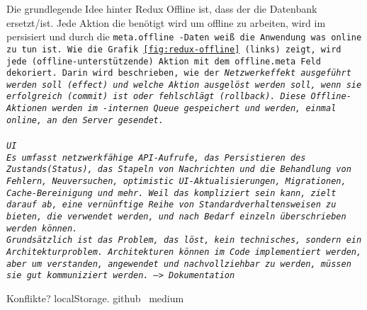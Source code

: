 Die grundlegende Idee hinter Redux Offline ist, dass der  die Datenbank ersetzt/ist. Jede Aktion die benötigt wird um offline zu arbeiten, wird im  persisiert und durch die \tt{meta.offline} -Daten weiß die Anwendung was online zu tun ist. Wie die Grafik \ref{fig:redux-offline} (links) zeigt, wird jede (offline-unterstützende) Aktion mit dem \tt{offline.meta} Feld dekoriert. Darin wird beschrieben, wie der \it{Netzwerkeffekt} ausgeführt werden soll (\tt{effect}) und welche Aktion ausgelöst werden soll, wenn sie erfolgreich (\tt{commit}) ist oder fehlschlägt (\tt{rollback}). Diese Offline-Aktionen werden im -internen \gls{Queue} gespeichert und werden, einmal online, an den Server gesendet.\\\\
\gls{UI}\\
 Es umfasst netzwerkfähige \gls{API}-Aufrufe, das Persistieren des Zustands(Status), das Stapeln von Nachrichten und die Behandlung von Fehlern, Neuversuchen, \gls{optimistic UI}-Aktualisierungen, Migrationen, Cache-Bereinigung und mehr.
Weil das kompliziert sein kann, zielt  darauf ab, eine vernünftige Reihe von Standardverhaltensweisen zu bieten, die verwendet werden, und nach Bedarf einzeln überschrieben werden können.\\
Grundsätzlich ist das Problem, das  löst, kein technisches, sondern ein Architekturproblem. Architekturen können im Code implementiert werden, aber um verstanden, angewendet und nachvollziehbar zu werden, müssen sie gut kommuniziert werden. --> Dokumentation

{\large Konflikte?}
  localStorage. github~\cite{redux-persist-gh} medium~\cite{redux-persist}
